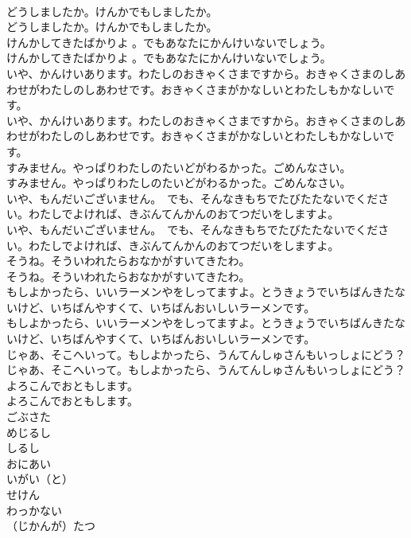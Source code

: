 \documentclass[8pt]{extreport}
\begin{document}
\begin{CJK}{UTF8}{min}
\\	どうしましたか。けんかでもしましたか。
\\	どうしましたか。けんかでもしましたか。
\\	けんかしてきたばかりよ 。でもあなたにかんけいないでしょう。
\\	けんかしてきたばかりよ 。でもあなたにかんけいないでしょう。
\\	いや、かんけいあります。わたしのおきゃくさまですから。おきゃくさまのしあわせがわたしのしあわせです。おきゃくさまがかなしいとわたしもかなしいです。
\\	いや、かんけいあります。わたしのおきゃくさまですから。おきゃくさまのしあわせがわたしのしあわせです。おきゃくさまがかなしいとわたしもかなしいです。
\\	すみません。やっぱりわたしのたいどがわるかった。ごめんなさい。
\\	すみません。やっぱりわたしのたいどがわるかった。ごめんなさい。
\\	いや、もんだいございません。　でも、そんなきもちでたびたたないでください。わたしでよければ、きぶんてんかんのおてつだいをしますよ。
\\	いや、もんだいございません。　でも、そんなきもちでたびたたないでください。わたしでよければ、きぶんてんかんのおてつだいをしますよ。
\\	そうね。そういわれたらおなかがすいてきたわ。
\\	そうね。そういわれたらおなかがすいてきたわ。
\\	もしよかったら、いいラーメンやをしってますよ。とうきょうでいちばんきたないけど、いちばんやすくて、いちばんおいしいラーメンです。
\\	もしよかったら、いいラーメンやをしってますよ。とうきょうでいちばんきたないけど、いちばんやすくて、いちばんおいしいラーメンです。
\\	じゃあ、そこへいって。もしよかったら、うんてんしゅさんもいっしょにどう？
\\	じゃあ、そこへいって。もしよかったら、うんてんしゅさんもいっしょにどう？
\\	よろこんでおともします。
\\	よろこんでおともします。
\\	ごぶさた
\\	めじるし
\\	しるし
\\	おにあい
\\	いがい（と）
\\	せけん
\\	わっかない
\\	（じかんが）たつ

\end{CJK}
\end{document}
